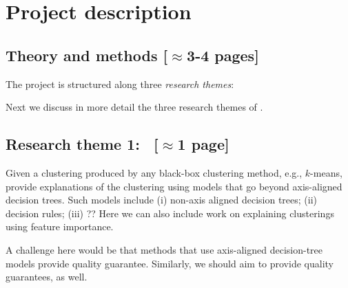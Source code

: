 \documentclass[a4paper,11pt]{article}
\begin{document}

\section{Project description}


\subsection{Theory and methods {\color{orange}[$\approx$3-4 pages]}}


The project is structured along three {\em research themes}:

\begin{description}
\setlength{\itemsep}{-2pt}
\item[\newmodels\,:] 

\item[\clusterings\,:] 

\item[\labels\,:]
\end{description}

Next we discuss in more detail the three research themes of \acronym.

\subsection*{Research theme 1: \newmodels\ {\color{orange}[$\approx$1 page]}}

Given a clustering produced by any black-box clustering method, e.g., $k$-means,
provide explanations of the clustering using models that go beyond axis-aligned decision trees.
Such models include 
(i) non-axis aligned decision trees;
(ii) decision rules;
(iii) ??
Here we can also include work on explaining clusterings using feature importance. 

A challenge here would be that methods that use axis-aligned decision-tree models
provide quality guarantee. 
Similarly, we should aim to provide quality guarantees, as well.
\end{document}

